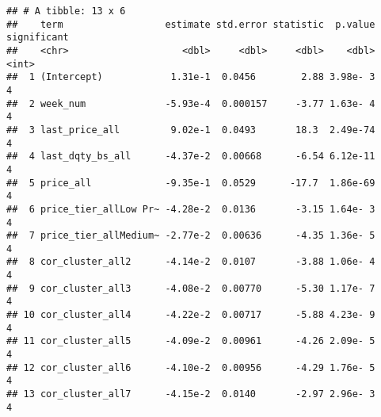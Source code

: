 \documentclass[]{article}
\begin{document}
\begin{verbatim}
## # A tibble: 13 x 6
##    term                  estimate std.error statistic  p.value significant
##    <chr>                    <dbl>     <dbl>     <dbl>    <dbl>       <int>
##  1 (Intercept)            1.31e-1  0.0456        2.88 3.98e- 3           4
##  2 week_num              -5.93e-4  0.000157     -3.77 1.63e- 4           4
##  3 last_price_all         9.02e-1  0.0493       18.3  2.49e-74           4
##  4 last_dqty_bs_all      -4.37e-2  0.00668      -6.54 6.12e-11           4
##  5 price_all             -9.35e-1  0.0529      -17.7  1.86e-69           4
##  6 price_tier_allLow Pr~ -4.28e-2  0.0136       -3.15 1.64e- 3           4
##  7 price_tier_allMedium~ -2.77e-2  0.00636      -4.35 1.36e- 5           4
##  8 cor_cluster_all2      -4.14e-2  0.0107       -3.88 1.06e- 4           4
##  9 cor_cluster_all3      -4.08e-2  0.00770      -5.30 1.17e- 7           4
## 10 cor_cluster_all4      -4.22e-2  0.00717      -5.88 4.23e- 9           4
## 11 cor_cluster_all5      -4.09e-2  0.00961      -4.26 2.09e- 5           4
## 12 cor_cluster_all6      -4.10e-2  0.00956      -4.29 1.76e- 5           4
## 13 cor_cluster_all7      -4.15e-2  0.0140       -2.97 2.96e- 3           4
\end{verbatim}
\end{document}
